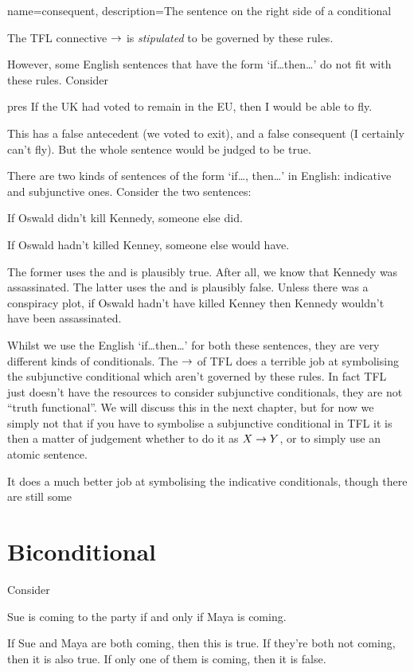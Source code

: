 {
name=consequent,
description={The sentence on the right side of a \gls{conditional}}
}

The TFL connective $\rightarrow$ is \emph{stipulated} to be governed by these rules. 

However, some English sentences that have the form `if\ldots then\ldots' do not fit with these rules.
Consider 
\begin{earg}
\item[pres] If the UK had voted to remain in the EU, then I would be able to fly.
\end{earg}
This has a false antecedent (we voted to exit), and a false consequent (I certainly can't fly). But the whole sentence would be judged to be true. 

There are two kinds of sentences of the form `if\ldots, then\ldots' in English: indicative and subjunctive ones. 
Consider the two sentences:
\begin{earg}
\item[\ex{indicative}] If Oswald didn't kill Kennedy, someone else did.
\item[\ex{subjunctive}] If Oswald hadn't killed Kenney, someone else would have.
\end{earg}
The former uses the  and is plausibly true. After all, we know that Kennedy was assassinated. The latter uses the  and is plausibly false. Unless there was a conspiracy plot, if Oswald hadn't have killed Kenney then Kennedy wouldn't have been assassinated. 

Whilst we use the English `if\ldots then\ldots' for both these sentences, they are very different kinds of conditionals. The $\rightarrow$ of TFL does a terrible job at symbolising the subjunctive conditional which aren't governed by these rules. In fact TFL just doesn't have the resources to consider subjunctive conditionals, they are not ``truth functional''. We will discuss this in the next chapter, but for now we simply not that if you have to symbolise a subjunctive conditional in TFL it is then a matter of judgement whether to do it as $X\rightarrow Y$, or to simply use an atomic sentence. 

It does a much better job at symbolising the indicative conditionals, though there are still some 


\section{Biconditional}
Consider
\begin{earg}
\item[\ex{bicond}] Sue is coming to the party if and only if Maya is coming.
\end{earg}
If Sue and Maya are both coming, then this is true. If they're both not coming, then it is also true. If only one of them is coming, then it is false.


